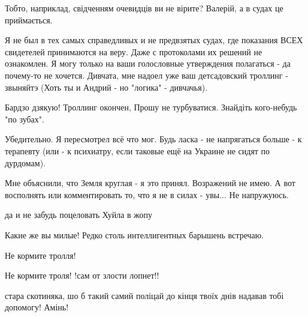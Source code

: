 \begin{itemize}

Тобто, наприклад, свідченням очевидців ви не вірите? Валерій, а в судах це
приймається.


Я не был в тех самых справедливых и не предвзятых судах, где показания ВСЕХ
свидетелей принимаются на веру. Даже с протоколами их решений не ознакомлен. Я
могу только на ваши голословные утверждения полагаться - да почему-то не
хочется. Дивчата, мне надоел уже ваш детсадовский троллинг - звыняйтэ (Хоть ты
и Андрий - но "логика" - дивчачья).

Бардзо дзякую! Троллинг окончен, Прошу не турбуватися. Знайдіть кого-небудь "по зубах".


Убедительно. Я пересмотрел всё что мог. Будь ласка - не напрягаться больше - к
терапевту (или - к психиатру, если таковые ещё на Украине не сидят по
дурдомам).


Мне объяснили, что Земля круглая - я это принял. Возражений не имею. А вот
восполнять или комментировать то, что я не в силах - увы... Не напружуюсь.

да и не забудь поцеловать Хуйла в жопу

Какие же вы милые! Редко столь интеллигентных барышень встречаю.

Не кормите тролля!

Не кормите троля! !сам от злости лопнет!!

стара скотиняка, шо б такий самий поліцай до кінця твоїх днів надавав тобі допомогу! Амінь!

\end{itemize} %
